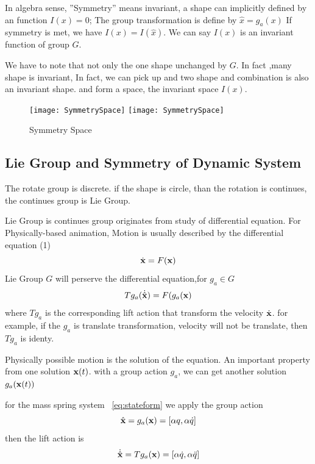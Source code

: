 In algebra sense, ''Symmetry'' means invariant, a shape can implicitly defined by an function $I(x)=0$;
The group transformation is define by $\hat{x}=g_a(x)$
If symmetry is met, we have $I(x)=I(\hat{x})$.
We can say $I(x)$ is an invariant function of group $G$.

We have to note that not only the one shape unchanged by $G$.
In fact ,many shape is invariant, 
In fact, we can pick up and two shape and combination is also an invariant shape. 
and form a space, the invariant space $I(x)$.


\begin{figure}[!htbp]
  \begin{center}
    \leavevmode
    \ifpdf
      \texttt{[image: SymmetrySpace]}
    \else
      \texttt{[image: SymmetrySpace]}
    \fi
    \caption{Symmetry Space}
    \label{fig:symmetry Space}
\end{center}
\end{figure}





\subsection{Lie Group and Symmetry of Dynamic System}
The rotate group is discrete.
if the shape is circle, than the rotation is continues, the continues group is Lie Group.

Lie Group is continues group originates from study of differential equation.
For Physically-based animation,
Motion is usually described by the differential equation (1)
\begin{equation}
	\dot{\mathbf{x}}=F(\mathbf{x})
\end{equation}
Lie Group $G$ will perserve the differential equation,for $g_a \in G$ 
\[
Tg_a(\dot{\hat{\mathbf{x}}})=F(g_a(\mathbf{x})
\]
where $Tg_a$ is the corresponding lift action that transform the velocity $\dot{\mathbf{x}}$.
for example, if the $g_a$ is translate transformation, velocity will not be translate, then $Tg_a$ is identy.





Physically possible motion is the solution of the equation.
An important property from one solution $\mathbf{x}(t)$.
with a group action $g_a$, we can get another solution $g_a(\mathbf{x}(t))$
 	
for the mass spring system ~\ref{eq:stateform}
we apply the group action 
\[
\hat{\mathbf{x}}=g_a(\mathbf{x})=[\alpha q, \alpha \dot{q} ]
\]
then the lift action is
\[
\dot{\hat{\mathbf{x}}}=Tg_a(\mathbf{x})=[\alpha \dot{q}, \alpha \ddot{q}]
\]



